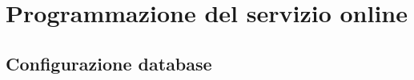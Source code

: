 \chapter{Programmazione del servizio online}\label{cap:Programmazione del servizio online}

\section{Configurazione database}\label{sez:Configurazione database}